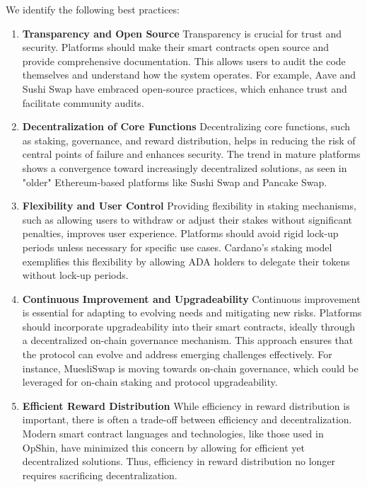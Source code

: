 \documentclass[12pt,parskip=full, tikz]{article}
\begin{document}
We identify the following best practices:
\begin{enumerate}
    \item \textbf{Transparency and Open Source}
    Transparency is crucial for trust and security. Platforms should make their smart contracts open source and provide comprehensive documentation. This allows users to audit the code themselves and understand how the system operates. For example, Aave and Sushi Swap have embraced open-source practices, which enhance trust and facilitate community audits.

    \item \textbf{Decentralization of Core Functions}
    Decentralizing core functions, such as staking, governance, and reward distribution, helps in reducing the risk of central points of failure and enhances security. The trend in mature platforms shows a convergence toward increasingly decentralized solutions, as seen in "older" Ethereum-based platforms like Sushi Swap and Pancake Swap.

    \item \textbf{Flexibility and User Control}
    Providing flexibility in staking mechanisms, such as allowing users to withdraw or adjust their stakes without significant penalties, improves user experience. Platforms should avoid rigid lock-up periods unless necessary for specific use cases. Cardano’s staking model exemplifies this flexibility by allowing ADA holders to delegate their tokens without lock-up periods.

    \item \textbf{Continuous Improvement and Upgradeability}
    Continuous improvement is essential for adapting to evolving needs and mitigating new risks. Platforms should incorporate upgradeability into their smart contracts, ideally through a decentralized on-chain governance mechanism. This approach ensures that the protocol can evolve and address emerging challenges effectively. For instance, MuesliSwap is moving towards on-chain governance, which could be leveraged for on-chain staking and protocol upgradeability.

    \item \textbf{Efficient Reward Distribution}
    While efficiency in reward distribution is important, there is often a trade-off between efficiency and decentralization. Modern smart contract languages and technologies, like those used in OpShin, have minimized this concern by allowing for efficient yet decentralized solutions. Thus, efficiency in reward distribution no longer requires sacrificing decentralization.
\end{enumerate}
\end{document}

